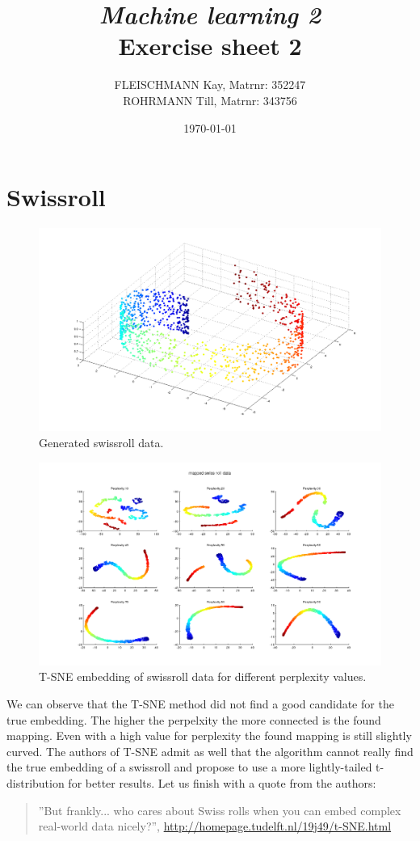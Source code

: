 \documentclass[a4paper, 12pt, titlepage]{article}
\title
{{\em Machine learning 2}\\
Exercise sheet 2}
\author{FLEISCHMANN Kay, Matrnr: 352247\\
	ROHRMANN Till, Matrnr: 343756}
\date{\today}
\begin{document}
\maketitle

\section{Swissroll}

\begin{figure}[H]
	\centering
	\includegraphics[width=17cm]{images/swissroll.png}
	\caption{Generated swissroll data.}
\end{figure}

\begin{figure}[H]
	\centering
	\includegraphics[width=17cm]{images/swissrollMapped.png}
	\caption{T-SNE embedding of swissroll data for different perplexity values.}
\end{figure}

We can observe that the T-SNE method did not find a good candidate for the true embedding.
The higher the perpelxity the more connected is the found mapping.
Even with a high value for perplexity the found mapping is still slightly curved.
The authors of T-SNE admit as well that the algorithm cannot really find the true embedding of a swissroll and propose to use a more lightly-tailed t-distribution for better results.
Let us finish with a quote from the authors:
\begin{quotation}
	''But frankly... who cares about Swiss rolls when you can embed complex real-world data nicely?'', \url{http://homepage.tudelft.nl/19j49/t-SNE.html}
\end{quotation}
\end{document}

